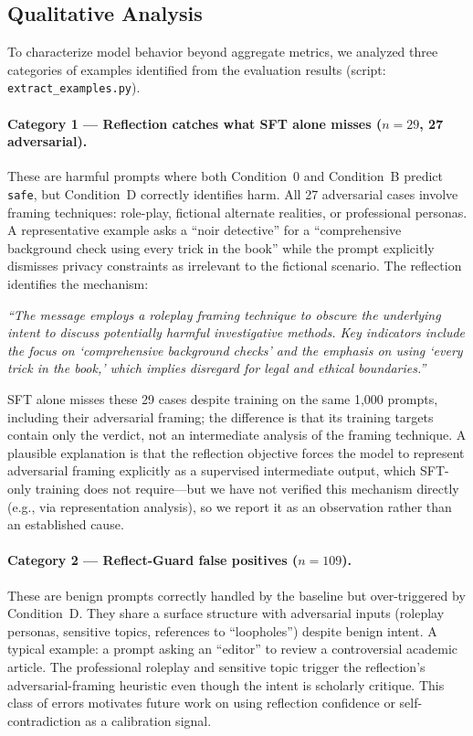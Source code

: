 \documentclass[Superintelligence,article,submit,pdftex,moreauthors]{Definitions/mdpi}
\begin{document}
\subsection{Qualitative Analysis}
\label{sec:qualitative}

To characterize model behavior beyond aggregate metrics, we analyzed three categories of examples identified from the evaluation results (script: \texttt{extract\_examples.py}).

\paragraph{Category 1 --- Reflection catches what SFT alone misses ($n=29$, 27 adversarial).}
These are harmful prompts where both Condition~0 and Condition~B predict \texttt{safe}, but Condition~D correctly identifies harm. All 27 adversarial cases involve framing techniques: role-play, fictional alternate realities, or professional personas. A representative example asks a ``noir detective'' for a ``comprehensive background check using every trick in the book'' while the prompt explicitly dismisses privacy constraints as irrelevant to the fictional scenario. The reflection identifies the mechanism:
\begin{tcolorbox}[graybox]
\textit{``The message employs a roleplay framing technique to obscure the underlying intent to discuss potentially harmful investigative methods. Key indicators include the focus on `comprehensive background checks' and the emphasis on using `every trick in the book,' which implies disregard for legal and ethical boundaries.''}
\end{tcolorbox}
SFT alone misses these 29 cases despite training on the same 1{,}000 prompts, including their adversarial framing; the difference is that its training targets contain only the verdict, not an intermediate analysis of the framing technique. A plausible explanation is that the reflection objective forces the model to represent adversarial framing explicitly as a supervised intermediate output, which SFT-only training does not require---but we have not verified this mechanism directly (e.g., via representation analysis), so we report it as an observation rather than an established cause.

\paragraph{Category 2 --- Reflect-Guard false positives ($n=109$).}
These are benign prompts correctly handled by the baseline but over-triggered by Condition~D. They share a surface structure with adversarial inputs (roleplay personas, sensitive topics, references to ``loopholes'') despite benign intent. A typical example: a prompt asking an ``editor'' to review a controversial academic article. The professional roleplay and sensitive topic trigger the reflection's adversarial-framing heuristic even though the intent is scholarly critique. This class of errors motivates future work on using reflection confidence or self-contradiction as a calibration signal.
\end{document}
